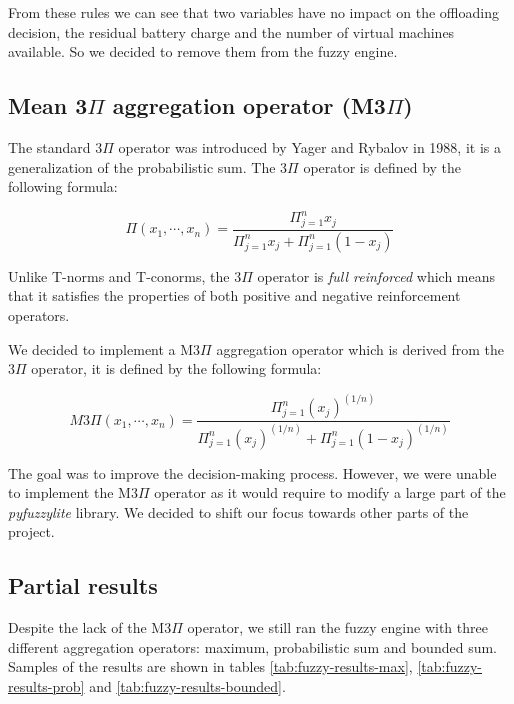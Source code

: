 From these rules we can see that two variables have no impact on the offloading decision, the residual battery charge
and the number of virtual machines available. So we decided to remove them from the fuzzy engine.

\subsection{Mean 3\texorpdfstring{$\Pi$}{Pi} aggregation operator (M3\texorpdfstring{$\Pi$}{Pi})}

The standard 3$\Pi$ operator was introduced by Yager and Rybalov \cite{yager-rybalov-1998} in 1988, it is a
generalization of the probabilistic sum. The 3$\Pi$ operator is defined by the following formula:

\begin{equation}
	\Pi(x_1, \cdots, x_n) = \frac{\Pi_{j=1}^n x_j}{\Pi_{j=1}^n x_j + \Pi_{j=1}^n (1 - x_j)}
\end{equation}

Unlike T-norms and T-conorms, the 3$\Pi$ operator is \textit{full reinforced} which means that it satisfies the
properties of both positive
and negative reinforcement operators.

We decided to implement a M3$\Pi$ aggregation operator which is derived from the 3$\Pi$ operator, it is defined by the
following formula:

\begin{equation}
	M3\Pi(x_1, \cdots, x_n) = \frac{\Pi_{j=1}^n (x_j)^{(1/n)}}{\Pi_{j=1}^n (x_j)^{(1/n)} + \Pi_{j=1}^n (1 - x_j)^{(1/n)}}
\end{equation}

The goal was to improve the decision-making process. However, we were unable to implement the M3$\Pi$ operator as it
would require to modify a large part of the \textit{pyfuzzylite} library. We decided to shift our focus towards other
parts of the project.

\subsection{Partial results}

Despite the lack of the M3$\Pi$ operator, we still ran the fuzzy engine with three different aggregation operators:
maximum, probabilistic sum and bounded sum. Samples of the results are shown in tables \ref{tab:fuzzy-results-max},
\ref{tab:fuzzy-results-prob} and \ref{tab:fuzzy-results-bounded}.

